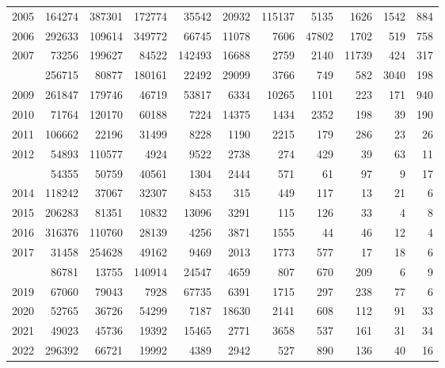 \documentclass[
]{article}
\begin{document}
\begin{longtable}[t]{lrrrrrrrrrr}
2005 & 164274 & 387301 & 172774 & 35542 & 20932 & 115137 & 5135 & 1626 & 1542 & 884\\
2006 & 292633 & 109614 & 349772 & 66745 & 11078 & 7606 & 47802 & 1702 & 519 & 758\\
2007 & 73256 & 199627 & 84522 & 142493 & 16688 & 2759 & 2140 & 11739 & 424 & 317\\
\addlinespace
2008 & 256715 & 80877 & 180161 & 22492 & 29099 & 3766 & 749 & 582 & 3040 & 198\\
2009 & 261847 & 179746 & 46719 & 53817 & 6334 & 10265 & 1101 & 223 & 171 & 940\\
2010 & 71764 & 120170 & 60188 & 7224 & 14375 & 1434 & 2352 & 198 & 39 & 190\\
2011 & 106662 & 22196 & 31499 & 8228 & 1190 & 2215 & 179 & 286 & 23 & 26\\
2012 & 54893 & 110577 & 4924 & 9522 & 2738 & 274 & 429 & 39 & 63 & 11\\
\addlinespace
2013 & 54355 & 50759 & 40561 & 1304 & 2444 & 571 & 61 & 97 & 9 & 17\\
2014 & 118242 & 37067 & 32307 & 8453 & 315 & 449 & 117 & 13 & 21 & 6\\
2015 & 206283 & 81351 & 10832 & 13096 & 3291 & 115 & 126 & 33 & 4 & 8\\
2016 & 316376 & 110760 & 28139 & 4256 & 3871 & 1555 & 44 & 46 & 12 & 4\\
2017 & 31458 & 254628 & 49162 & 9469 & 2013 & 1773 & 577 & 17 & 18 & 6\\
\addlinespace
2018 & 86781 & 13755 & 140914 & 24547 & 4659 & 807 & 670 & 209 & 6 & 9\\
2019 & 67060 & 79043 & 7928 & 67735 & 6391 & 1715 & 297 & 238 & 77 & 6\\
2020 & 52765 & 36726 & 54299 & 7187 & 18630 & 2141 & 608 & 112 & 91 & 33\\
2021 & 49023 & 45736 & 19392 & 15465 & 2771 & 3658 & 537 & 161 & 31 & 34\\
2022 & 296392 & 66721 & 19992 & 4389 & 2942 & 527 & 890 & 136 & 40 & 16\\*
\end{longtable}
\end{document}
